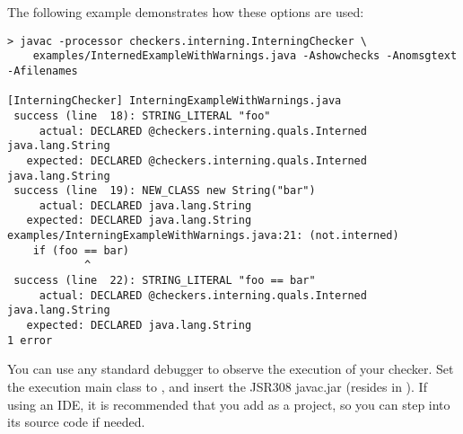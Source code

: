 The following example demonstrates how these options are used:

\begin{smaller}
\begin{Verbatim}
> javac -processor checkers.interning.InterningChecker \
    examples/InternedExampleWithWarnings.java -Ashowchecks -Anomsgtext -Afilenames

[InterningChecker] InterningExampleWithWarnings.java
 success (line  18): STRING_LITERAL "foo"
     actual: DECLARED @checkers.interning.quals.Interned java.lang.String
   expected: DECLARED @checkers.interning.quals.Interned java.lang.String
 success (line  19): NEW_CLASS new String("bar")
     actual: DECLARED java.lang.String
   expected: DECLARED java.lang.String
examples/InterningExampleWithWarnings.java:21: (not.interned)
    if (foo == bar)
            ^
 success (line  22): STRING_LITERAL "foo == bar"
     actual: DECLARED @checkers.interning.quals.Interned java.lang.String
   expected: DECLARED java.lang.String
1 error
\end{Verbatim}
\end{smaller}

You can use any standard debugger to observe the execution of your checker.  Set the execution main class to , and insert the JSR308 javac.jar (resides in ).  If using an IDE, it is recommended that you add  as a project, so you can
step into its source code if needed.

%
%



